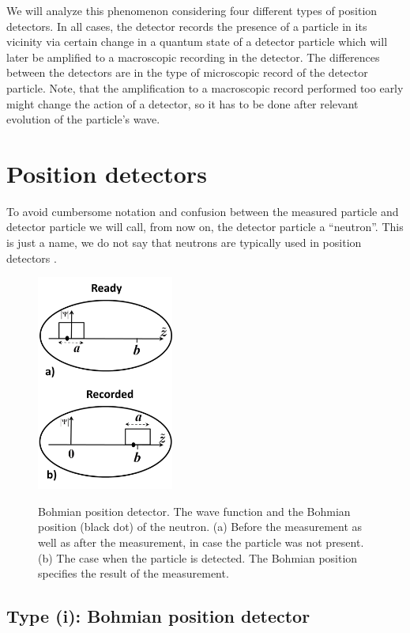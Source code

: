 \documentclass[preprint,tightenlines]{elsarticle}
\begin{document}
We will analyze this phenomenon considering
four different types of position detectors. In all cases, the detector
records the presence of a particle in its vicinity  via certain change
in a quantum state of a detector particle which will later be amplified
to a macroscopic recording in the detector. The differences between
the detectors are in the type of microscopic record of the detector
particle. Note, that  the amplification to a macroscopic record performed too early  might change the action of  a detector, so it has to be done after relevant evolution of the particle's wave.


\section{ Position detectors}

To avoid cumbersome notation and confusion between the measured particle
and detector particle we will call, from now on, the detector particle
a ``neutron''. This is just a name, we do not say that  neutrons are typically used in position detectors .



\begin{figure}[H]
  \includegraphics[width=4.5cm]{3.pdf}\\ \vspace{-6pt}
    \caption{ Bohmian position detector. The wave function  and the Bohmian position (black dot) of the neutron. (a)    Before the measurement as well as after the measurement, in case the particle was not present. (b) The case when the particle is detected. The Bohmian position specifies the result of the measurement.}
\end{figure}



\subsection{ Type {\rm (i)}: Bohmian position detector}
\end{document}
